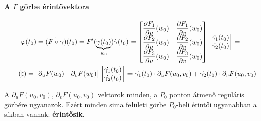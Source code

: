 \paragraph{A $\Gamma$ görbe érintővektora}%
\begin{gather*}
  \varphi(t_0) = (\Dot{F\circ \gamma})(t_0) = F'(\underbrace{\gamma(t_0)}_{w_0}) \Dot{\gamma}(t_0) = 
  \begin{bmatrix}
    \dfrac{\partial F_1}{\partial u}(w_0) &  \dfrac{\partial F_1}{\partial v}(w_0)\\
    \dfrac{\partial F_2}{\partial u}(w_0) &  \dfrac{\partial F_2}{\partial v}(w_0)\\
    \dfrac{\partial F_3}{\partial u}(w_0) &  \dfrac{\partial F_3}{\partial v}(w_0)\\
  \end{bmatrix} \begin{bmatrix}\Dot{\gamma_1}(t_0) \\ \Dot{\gamma_2}(t_0)\end{bmatrix} =\\ \tag{$\sharp$}\label{eq:sharp}
  = \begin{bmatrix}\partial_uF(w_0) & \partial_vF(w_0) \end{bmatrix} \begin{bmatrix}\Dot{\gamma_1}(t_0) \\
    \Dot{\gamma_2}(t_0)\end{bmatrix} = \Dot{\gamma_1}(t_0) \cdot \partial_uF(u_0,v_0) + \Dot{\gamma_2}(t_0) \cdot
  \partial_vF(u_0,v_0)    
\end{gather*}

\begin{megj}
  A $\partial_uF(u_0,v_0)$, $\partial_vF(u_0,v_0)$ vektorok minden, a $P_0$ ponton átmenő reguláris görbére
  ugyanazok. Ezért minden sima felületi görbe $P_0$-beli érintői ugyanabban a síkban vannak: \textbf{érintősik}.
\end{megj}

